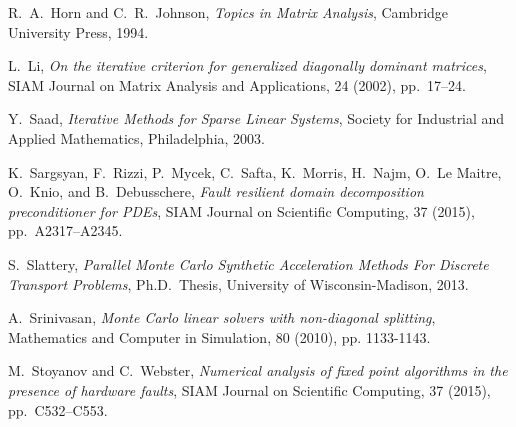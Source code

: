 \documentclass[final,leqno,onefignum,onetabnum]{siamltex1213}
\begin{document}
\begin{thebibliography}{9}
  {\sc R.~A.~Horn and C.~R.~Johnson},
  {\em Topics in Matrix Analysis},
  Cambridge University Press, 1994.

  {\sc L.~Li},
  {\em On the iterative criterion for generalized diagonally dominant
matrices},
  SIAM Journal on Matrix Analysis and Applications,
  24 (2002), pp.~17--24.

 {\sc Y.~Saad},
 {\em Iterative Methods for Sparse Linear Systems},
 Society for Industrial and Applied Mathematics, Philadelphia, 2003.

  {\sc K.~Sargsyan, F.~Rizzi, P.~Mycek, C.~Safta, K.~Morris, H.~Najm,
  O.~Le Maitre, O.~Knio, and B.~Debusschere},
  {\em Fault resilient domain decomposition preconditioner for PDEs},
  SIAM Journal on Scientific Computing,
  37 (2015), pp.~A2317--A2345.

 {\sc S.~Slattery},
 {\em Parallel Monte Carlo Synthetic Acceleration Methods For Discrete
Transport Problems},
 Ph.D.~Thesis, University of Wisconsin-Madison, 2013.

 {\sc A.~Srinivasan},
 {\em Monte Carlo linear solvers with non-diagonal splitting},
 Mathematics and Computer in Simulation,
 80 (2010), pp. 1133-1143.

 {\sc M.~Stoyanov and C.~Webster},
 {\em Numerical analysis of fixed point algorithms in the presence of hardware
  faults},
  SIAM Journal on Scientific Computing,
  37 (2015), pp.~C532--C553.

\end{thebibliography}
\end{document}
